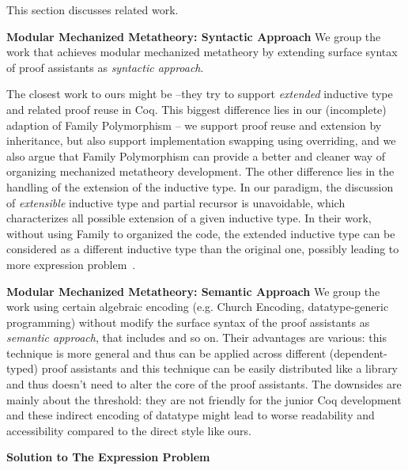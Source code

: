 This section discusses related work.




\textbf{Modular Mechanized Metatheory: Syntactic Approach} We group the work that achieves modular mechanized metatheory by extending surface syntax of proof assistants as \textit{syntactic approach}. 

The closest work to ours might be \citet{boite2004proo}--they try to support \textit{extended} inductive type and related proof reuse in Coq. This biggest difference lies in our (incomplete) adaption of Family Polymorphism -- we support proof reuse and extension by inheritance, but also support implementation swapping using overriding, and we also argue that Family Polymorphism can provide a better and cleaner way of organizing mechanized metatheory development. The other difference lies in the handling of the extension of the inductive type. In our paradigm, the discussion of \textit{extensible} inductive type and partial recursor is unavoidable, which characterizes all possible extension of a given inductive type. In their work, without using Family to organized the code, the extended inductive type can be considered as a different inductive type than the original one, possibly leading to more expression problem~\cite{wadler-ep}.

\textbf{Modular Mechanized Metatheory: Semantic Approach} We group the work using certain algebraic encoding (e.g. Church Encoding, datatype-generic programming) without modify the surface syntax of the proof assistants as \textit{semantic approach}, that includes \citet{delaware2013,forsta2020,liwei2022,schwaab2013modular, keuchel2013generic} and so on. Their advantages are various: this technique is more general and thus can be applied across different (dependent-typed) proof assistants and this technique can be easily distributed like a library and thus doesn't need to alter the core of the proof assistants. The downsides are mainly about the threshold: they are not friendly for the junior Coq development and these indirect encoding of datatype might lead to worse readability and accessibility compared to the direct style like ours.




\textbf{Solution to The Expression Problem}
